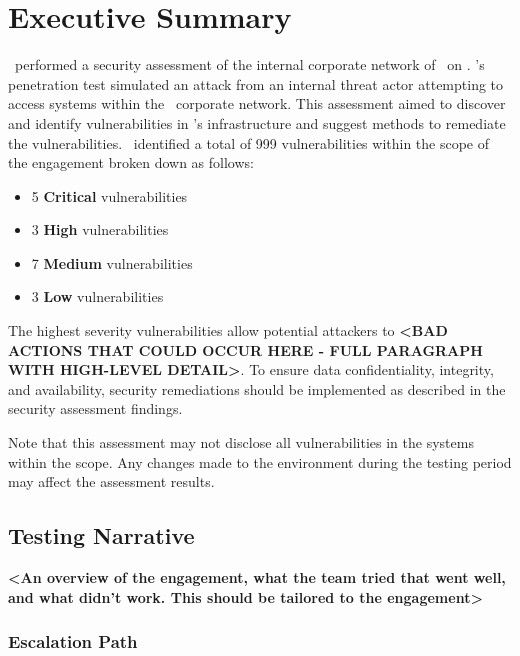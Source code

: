 \section{Executive Summary}

\begin{fullwidth}

\teamName\ performed a security assessment of the internal corporate network of \clientFullName\ on \reportDate. \teamName’s penetration test simulated an attack from an internal threat actor attempting to access systems within the \clientFullName\ corporate network. This assessment aimed to discover and identify vulnerabilities in \clientFullName’s infrastructure and suggest methods to remediate the vulnerabilities. \teamName\ identified a total of 999 vulnerabilities within the scope of the engagement broken down as follows:

\begin{itemize}
    \item 5 \textbf{Critical} vulnerabilities
    \item 3 \textbf{High} vulnerabilities
    \item 7 \textbf{Medium} vulnerabilities
    \item 3 \textbf{Low} vulnerabilities
\end{itemize}

The highest severity vulnerabilities allow potential attackers to \textbf{<BAD ACTIONS THAT COULD OCCUR HERE - FULL PARAGRAPH WITH HIGH-LEVEL DETAIL>}. To ensure data confidentiality, integrity, and availability, security remediations should be implemented as described in the security assessment findings. 

Note that this assessment may not disclose all vulnerabilities in the systems within the scope. Any changes made to the environment during the testing period may affect the assessment results.

\subsection{Testing Narrative}

\textbf{<An overview of the engagement, what the team tried that went well, and what didn't work. This should be tailored to the engagement>}

\subsubsection{Escalation Path}


\end{fullwidth}
